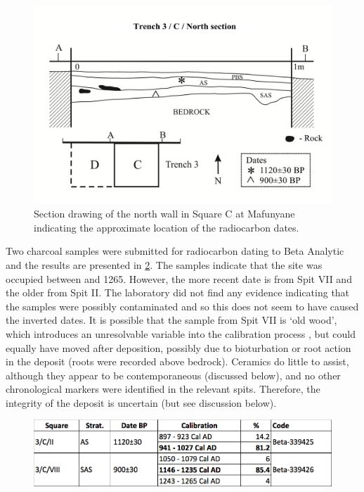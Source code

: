 \documentclass{ijsra}
\begin{document}
	\begin{figure}
		\includegraphics[width=\linewidth]{figures/Forssman-Figure03}
		\caption{Section drawing of the north wall in Square C at Mafunyane indicating the approximate location of the radiocarbon dates.}
		\centering
		\label{fig:Forssman-Figure03}
	\end{figure}

Two charcoal samples were submitted for radiocarbon dating to Beta Analytic and the results are presented in \cref{fig:Forssman-Table01}. 
The samples indicate that the site was occupied between  and 1265. 
However, the more recent date is from Spit VII and the older from Spit II. 
The laboratory did not find any evidence indicating that the samples were possibly contaminated and so this does not seem to have caused the inverted dates. 
It is possible that the sample from Spit VII is ‘old wood’, which introduces an unresolvable variable into the calibration process \parencite{Kennett_2002}, but could equally have moved after deposition, possibly due to bioturbation \parencite[see][]{Lancaster_2003} or root action in the deposit (roots were recorded above bedrock). 
Ceramics do little to assist, although they appear to be contemporaneous (discussed below), and no other chronological markers were identified in the relevant spits. Therefore, the integrity of the deposit is uncertain (but see discussion below).

	\begin{figure} %
		\includegraphics[width=\linewidth]{figures/Forssman-Table01}
		\label{fig:Forssman-Table01}
	\end{figure}
\end{document}

